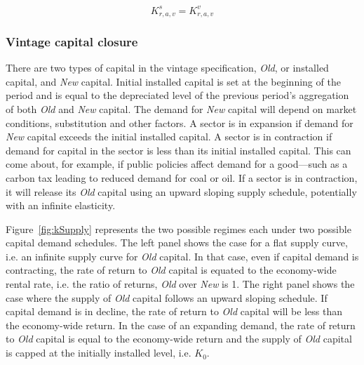 \documentclass[11pt,letterpaper]{report}
\begin{document}
\begin{equation}
\label{eq:pkcs}
K^s_{r,a,v} = K^v_{r,a,v}
\end{equation}

\subsubsection{Vintage capital closure}

There are two types of capital in the vintage specification, \emph{Old}, or installed
capital, and \emph{New} capital. Initial installed capital is set at the beginning of the period
and is equal to the depreciated level of the previous period's aggregation of
both \emph{Old} and \emph{New} capital. The demand for \emph{New} capital will
depend on market conditions, substitution and other factors. A sector
is in expansion if demand for \emph{New} capital exceeds the initial
installed capital. A sector is in contraction if demand for capital in the
sector is less than its initial installed capital. This can come about, for example,
if public policies affect demand for a good---such as a carbon tax leading
to reduced demand for coal or oil. If a sector is in contraction, it will
release its \emph{Old} capital using an upward sloping supply schedule, potentially
with an infinite elasticity.

Figure~\ref{fig:kSupply} represents the two
possible regimes each under two possible capital demand schedules. The
left panel shows the case for a flat supply curve, i.e. an infinite
supply curve for \emph{Old} capital. In that case, even if capital
demand is contracting, the rate of return to \emph{Old} capital
is equated to the economy-wide rental rate, i.e. the ratio of
returns, \emph{Old} over \emph{New} is 1. The right panel shows
the case where the supply of \emph{Old} capital follows an upward
sloping schedule. If capital demand is in decline, the rate
of return to \emph{Old} capital will be less than the economy-wide
return. In the case of an expanding demand, the rate of return
to \emph{Old} capital is equal to the economy-wide return and
the supply of \emph{Old} capital is capped at the initially installed
level, i.e. $K_0$.


\end{document}
